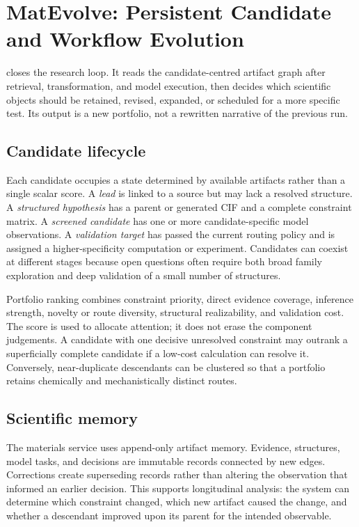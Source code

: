 \section{MatEvolve: Persistent Candidate and Workflow Evolution}
\label{sec:matevolve}

\matevolve closes the research loop.  It reads the candidate-centred artifact graph after retrieval, transformation, and model execution, then decides which scientific objects should be retained, revised, expanded, or scheduled for a more specific test.  Its output is a new portfolio, not a rewritten narrative of the previous run.

\subsection{Candidate lifecycle}

Each candidate occupies a state determined by available artifacts rather than a single scalar score.  A \emph{lead} is linked to a source but may lack a resolved structure.  A \emph{structured hypothesis} has a parent or generated CIF and a complete constraint matrix.  A \emph{screened candidate} has one or more candidate-specific model observations.  A \emph{validation target} has passed the current routing policy and is assigned a higher-specificity computation or experiment.  Candidates can coexist at different stages because open questions often require both broad family exploration and deep validation of a small number of structures.

Portfolio ranking combines constraint priority, direct evidence coverage, inference strength, novelty or route diversity, structural realizability, and validation cost.  The score is used to allocate attention; it does not erase the component judgements.  A candidate with one decisive unresolved constraint may outrank a superficially complete candidate if a low-cost calculation can resolve it.  Conversely, near-duplicate descendants can be clustered so that a portfolio retains chemically and mechanistically distinct routes.

\subsection{Scientific memory}

The materials service uses append-only artifact memory.  Evidence, structures, model tasks, and decisions are immutable records connected by new edges.  Corrections create superseding records rather than altering the observation that informed an earlier decision.  This supports longitudinal analysis: the system can determine which constraint changed, which new artifact caused the change, and whether a descendant improved upon its parent for the intended observable.

